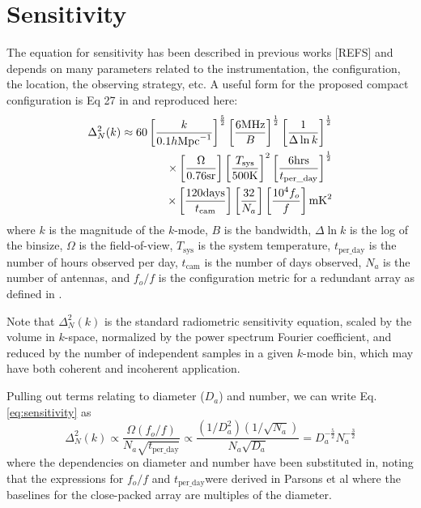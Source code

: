 \documentclass[11pt]{article}
\begin{document}
\section{Sensitivity}
The equation for sensitivity has been described in previous works [REFS] and depends on many parameters
related to the instrumentation, the configuration, the location, the observing strategy, etc.  A useful form for 
the proposed compact configuration is Eq 27 in \citep{Parsonsetal2012} and reproduced here:
\begin{equation}
\centering
\label{eq:sensitivity}
\begin{split}
\Delta^2_N(k) \approx 60 \left[\frac{k}{0.1h\text{Mpc}^{-1}}\right]^\frac{5}{2}
                                         \left[\frac{6 \text{MHz}}{B}\right]^\frac{1}{2}
                                         \left[\frac{1}{\Delta\ln k}\right]^\frac{1}{2} \\
                        \times       \left[\frac{\Omega}{0.76\text{sr}}\right]
                                         \left[\frac{T_\text{sys}}{500 \text{K}}\right]^2
                                         \left[\frac{6 \text{hrs}}{t_\text{per\_day}}\right]^\frac{1}{2} \\
                        \times       \left[\frac{120\text{days}}{t_{\text{cam}}}\right]
                                         \left[\frac{32}{N_a}\right]
                                         \left[\frac{\text{10}^4f_o}{f}\right]  \text{mK}^2
\end{split}
\end{equation}
where $k$ is the magnitude of the $k$-mode, $B$ is the bandwidth, $\Delta\ln k$ is the log
of the binsize, $\Omega$ is the field-of-view, $T_{\text{sys}}$ is the system temperature, 
${t_\text{per\_day}}$ is the number of hours observed per day, $t_{\text{cam}}$ is the number of days
observed, $N_a$ is the number of antennas, and $f_o/f$ is the configuration metric for a 
redundant array as defined in \citep{Parsonsetal2012}.

Note that $\Delta^2_N(k)$ is the standard radiometric sensitivity equation, scaled by
the volume in $k$-space, normalized by the power spectrum Fourier coefficient, and
reduced by the number of independent samples in a given $k$-mode bin, which may have
both coherent and incoherent application.

Pulling out terms relating to diameter ($D_a$) and number, we can write Eq. \ref{eq:sensitivity} as
\begin{equation}
\label{eq:reducedSensitivity}
\Delta^2_N(k) \propto \frac{\Omega (f_o/f)}{N_a\sqrt{t_\text{per\_day}}} \propto \frac{(1/D_a^2)(1/\sqrt{N_a})}{N_a\sqrt{D_a}}
= D_a^{-\frac{5}{2}}N_a^{-\frac{3}{2}}
\end{equation}
where the dependencies on diameter and number have been substituted in, noting that the expressions for $f_o/f$ and 
$t_\text{per\_day}$were derived in Parsons et al where the baselines for the close-packed array are multiples of the diameter.
\end{document}
